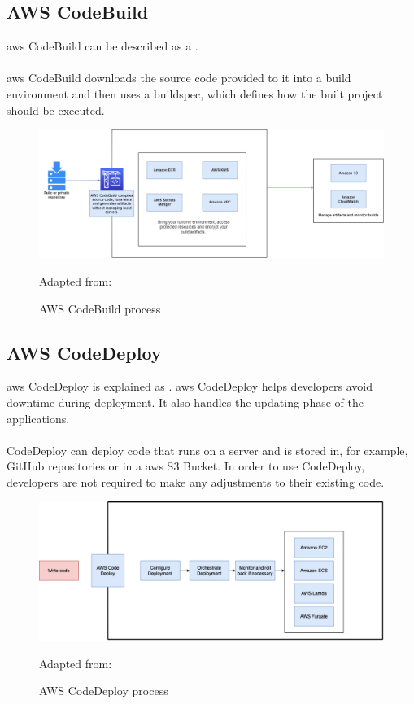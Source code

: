 \subsection{AWS CodeBuild }
\acrshort{aws} CodeBuild can be described as a  \cite{AWSCodeBuild}.
\\~\\
\acrshort{aws} CodeBuild downloads the source code provided to it into a build environment and then uses a \gls{buildspec}, which defines how the built project should be executed. \cite{AWSCodeBuild1}
\begin{figure}[H]
    \centering
    \includegraphics[scale=0.3]{Images/Codebuild.png}
    \caption{AWS CodeBuild process} Adapted from: \cite{AWSCodeBuild}
    \label{fig: AWS CodeBuild Process}
\end{figure}

\subsection{AWS CodeDeploy}
\acrshort{aws} CodeDeploy is explained as  \cite{AWSCodeDeploy}.
\acrshort{aws} CodeDeploy helps developers avoid downtime during deployment. It also handles the updating phase of the applications. 
\\~\\
CodeDeploy can deploy code that runs on a server and is stored in, for example, GitHub repositories or in a \acrshort{aws} S3 Bucket. In order to use CodeDeploy, developers are not required to make any adjustments to their existing code. \cite{CodeDeploy1}

\begin{figure}[H]
    \centering
    \includegraphics[scale=0.4]{Images/AWSCodeDeploy.png}
    \caption{AWS CodeDeploy process} Adapted from: \cite{CodeDeploy1}
    \label{fig: AWS CodeDeploy Process}
\end{figure}


